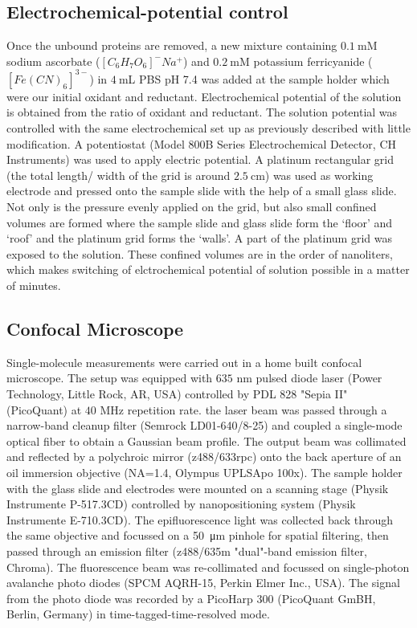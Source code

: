 \subsection{Electrochemical-potential control}
Once the unbound proteins are removed, a new mixture containing $0.1~$mM sodium ascorbate ($[C_6H_7O_6]^-Na^+$) and $0.2~$mM potassium ferricyanide ($[Fe(CN)_6]^{3-}$) in $4~$mL PBS pH 7.4 was added at the sample holder which were our initial oxidant and reductant. Electrochemical potential of the solution is obtained from the ratio of oxidant and reductant. The solution potential was controlled with the same electrochemical set up as previously described\cite{zhang2017gold} with little modification. A potentiostat (Model 800B Series Electrochemical Detector, CH Instruments) was used to apply electric potential. A platinum rectangular grid (the total length/ width of the grid is around $2.5~$cm) was used as working electrode and pressed onto the sample slide with the help of a small glass slide. Not only is the pressure evenly applied on the grid, but also small confined volumes are formed where the sample slide and glass slide form the `floor' and `roof' and the platinum grid forms the `walls'. A part of the platinum grid was exposed to the solution. These confined volumes are in the order of nanoliters, which makes switching of elctrochemical potential of solution possible in a matter of minutes.
\subsection{Confocal Microscope}
Single-molecule measurements were carried out in a home built confocal microscope. The setup was equipped with $635$ nm pulsed diode laser (Power Technology, Little Rock, AR, USA) controlled by PDL 828 "Sepia II" (PicoQuant) at $40$ MHz repetition rate. the laser beam was passed through a narrow-band cleanup filter (Semrock LD01-640/8-25) and coupled a single-mode optical fiber to obtain a Gaussian beam profile. The output beam was collimated and reflected by a polychroic mirror (z488/633rpc) onto the back aperture of an oil immersion objective (NA=1.4, Olympus UPLSApo 100x). The sample holder with the glass slide and electrodes were mounted on a scanning stage (Physik Instrumente P-517.3CD) controlled by nanopositioning system (Physik Instrumente E-710.3CD). The epifluorescence light was collected back through the same objective and focussed on a \SI{50}{\micro\metre} pinhole for spatial filtering, then passed through an emission filter (z488/635m "dual"-band emission filter, Chroma). The fluorescence beam was re-collimated and focussed on single-photon avalanche photo diodes (SPCM AQRH-15, Perkin Elmer Inc., USA). The signal from the photo diode was recorded by a PicoHarp 300 (PicoQuant GmBH, Berlin, Germany) in time-tagged-time-resolved mode.
